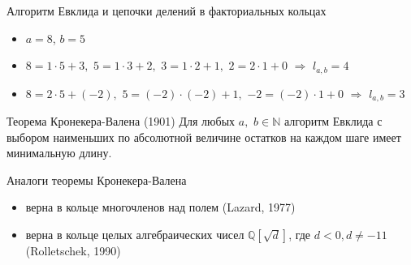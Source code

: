 \documentclass[8pt, xcolor=x11names]{beamer}
\begin{document}
\begin{frame}
    \begin{block}{Алгоритм Евклида и цепочки делений в факториальных кольцах}
        \begin{itemize}
            \item $a = 8$, $b = 5$
            
            \item $8 = 1\cdot 5 + 3,$ $5 =  1\cdot 3+2,$ $3=1\cdot 2+1,$ $2=2\cdot 1+0$ $\Rightarrow$ $l_{a,b}=4$
            
            \item $8=2\cdot 5+(-2),$ $5=(-2)\cdot (-2)+1,$ $-2=(-2)\cdot 1+0$ $\Rightarrow$ $l_{a,b}=3$
        \end{itemize}
    \end{block}

    \begin{block}{Теорема Кронекера-Валена (1901)}
        Для любых $a,$ $b\in \mathbb{N}$ алгоритм Евклида с выбором наименьших по абсолютной величине остатков на каждом шаге имеет минимальную длину.
    \end{block}
    
    \begin{block}{Аналоги теоремы Кронекера-Валена}
        \begin{itemize}
            \item верна в кольце многочленов над полем (Lazard, 1977)
            
            \item верна в кольце целых алгебраических чисел $\mathbb{Q}[\sqrt{d}]$, где $d<0, d \neq -11$ (Rolletschek, 1990)
        \end{itemize}
    \end{block}
\end{frame}
\end{document}

